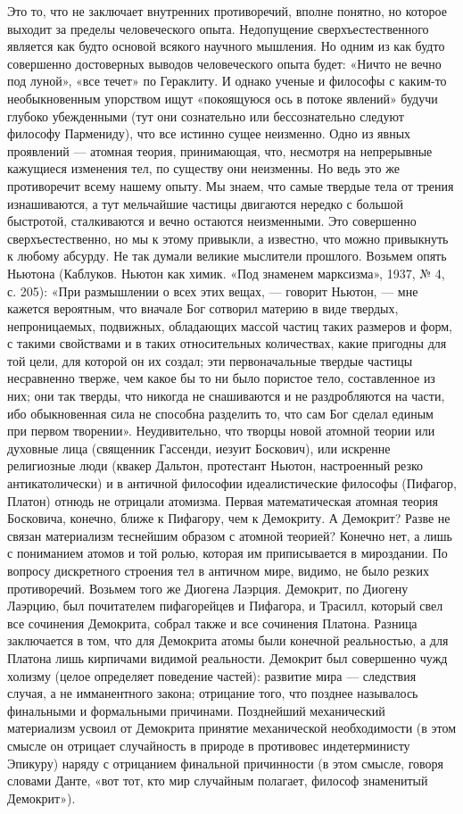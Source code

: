 Это то, что не заключает внутренних противоречий, вполне понятно, но которое
выходит за пределы человеческого опыта. Недопущение сверхъестественного
является как будто основой всякого научного мышления. Но одним из как будто
совершенно достоверных выводов человеческого опыта будет: «Ничто не вечно под
луной», «все течет» по Гераклиту. И однако ученые и философы с каким-то
необыкновенным упорством ищут «покоящуюся ось в потоке явлений» будучи глубоко
убежденными (тут они сознательно или бессознательно следуют философу
Пармениду), что все истинно сущее неизменно. Одно из явных проявлений --- атомная
теория, принимающая, что, несмотря на непрерывные кажущиеся изменения тел, по
существу они неизменны. Но ведь это же противоречит всему нашему опыту. Мы
знаем, что самые твердые тела от трения изнашиваются, а тут мельчайшие частицы
двигаются нередко с большой быстротой, сталкиваются и вечно остаются
неизменными. Это совершенно сверхъестественно, но мы к этому привыкли, а
известно, что можно привыкнуть к любому абсурду. Не так думали великие
мыслители прошлого. Возьмем опять Ньютона (Каблуков. Ньютон как химик. «Под
знаменем марксизма», 1937, № 4, с. 205): «При размышлении о всех этих вещах, ---
говорит Ньютон, --- мне кажется вероятным, что вначале Бог сотворил материю в
виде твердых, непроницаемых, подвижных, обладающих массой частиц таких размеров
и форм, с такими свойствами и в таких относительных количествах, какие пригодны
для той цели, для которой он их создал; эти первоначальные твердые частицы
несравненно тверже, чем какое бы то ни было пористое тело, составленное из них;
они так тверды, что никогда не снашиваются и не раздробляются на части, ибо
обыкновенная сила не способна разделить то, что сам Бог сделал единым при
первом творении». Неудивительно, что творцы новой атомной теории или духовные
лица (священник Гассенди, иезуит Боскович), или искренне религиозные люди
(квакер Дальтон, протестант Ньютон, настроенный резко антикатолически) и в
античной философии идеалистические философы (Пифагор, Платон) отнюдь не
отрицали атомизма. Первая математическая атомная теория Босковича, конечно,
ближе к Пифагору, чем к Демокриту. А Демокрит? Разве не связан
материализм теснейшим образом с атомной теорией? Конечно нет, а лишь с
пониманием атомов и той ролью, которая им приписывается в мироздании. По
вопросу дискретного строения тел в античном мире, видимо, не было резких
противоречий. Возьмем того же Диогена Лаэрция. Демокрит, по Диогену Лаэрцию,
был почитателем пифагорейцев и Пифагора, и Трасилл, который свел все сочинения
Демокрита, собрал также и все сочинения Платона. Разница заключается в том, что
для Демокрита атомы были конечной реальностью, а для Платона лишь кирпичами
видимой реальности. Демокрит был совершенно чужд холизму (целое определяет
поведение частей): развитие мира --- следствия случая, а не имманентного закона;
отрицание того, что позднее называлось финальными и формальными причинами.
Позднейший механический материализм усвоил от Демокрита принятие механической
необходимости (в этом смысле он отрицает случайность в природе в противовес
индетерминисту Эпикуру) наряду с отрицанием финальной причинности (в этом
смысле, говоря словами Данте, «вот тот, кто мир случайным полагает, философ
знаменитый Демокрит»).

